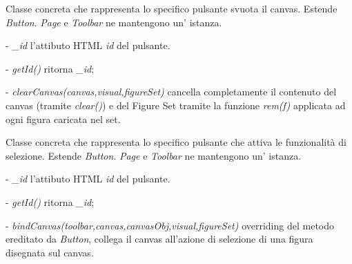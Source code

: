 Classe concreta che rappresenta lo specifico pulsante svuota il canvas.
Estende \textit{Button}.
\textit{Page} e \textit{Toolbar} ne mantengono un' istanza.
\begin{elencopuntato}[\subsubsecindent]
\item[-] \textit{{\_}id} l'attibuto HTML \textit{id} del pulsante.
\end{elencopuntato}
\begin{elencopuntato}[\subsubsecindent]
\item[-] \textit{getId()} ritorna  \textit{{\_}id};
\item[-]  \textit{clearCanvas(canvas,visual,figureSet)} cancella completamente il contenuto del canvas (tramite \textit{clear()}) e del Figure Set tramite la funzione \textit{rem(f)} applicata ad ogni figura caricata nel set. 
\end{elencopuntato}

Classe concreta che rappresenta lo specifico pulsante che attiva le funzionalit\` a di selezione.
Estende \textit{Button}.
\textit{Page} e \textit{Toolbar} ne mantengono un' istanza.
\begin{elencopuntato}[\subsubsecindent]
\item[-] \textit{{\_}id} l'attibuto HTML \textit{id} del pulsante.
\end{elencopuntato}
\begin{elencopuntato}[\subsubsecindent]
\item[-] \textit{getId()} ritorna  \textit{{\_}id};
\item[-]  \textit{bindCanvas(toolbar,canvas,canvasObj,visual,figureSet)} overriding del metodo ereditato da \textit{Button}, collega il canvas all'azione di selezione di una figura disegnata sul canvas.
\end{elencopuntato}


